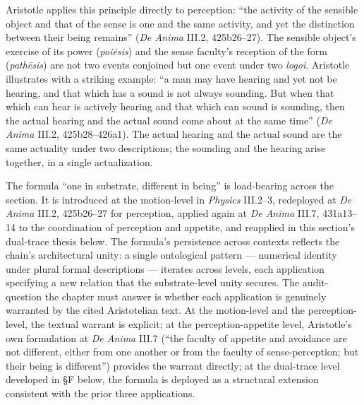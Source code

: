 Aristotle applies this principle directly to perception: ``the activity of the sensible object and that of the sense is one and the same activity, and yet the distinction between their being remains'' (\textit{De Anima} III.2, 425b26--27). The sensible object's exercise of its power (\textit{poiēsis}) and the sense faculty's reception of the form (\textit{pathēsis}) are not two events conjoined but one event under two \textit{logoi}. Aristotle illustrates with a striking example: ``a man may have hearing and yet not be hearing, and that which has a sound is not always sounding. But when that which can hear is actively hearing and that which can sound is sounding, then the actual hearing and the actual sound come about at the same time'' (\textit{De Anima} III.2, 425b28--426a1). The actual hearing and the actual sound are the same actuality under two descriptions; the sounding and the hearing arise together, in a single actualization.

The formula ``one in substrate, different in being'' is load-bearing across the section. It is introduced at the motion-level in \textit{Physics} III.2--3, redeployed at \textit{De Anima} III.2, 425b26--27 for perception, applied again at \textit{De Anima} III.7, 431a13--14 to the coordination of perception and appetite, and reapplied in this section's dual-trace thesis below. The formula's persistence across contexts reflects the chain's architectural unity: a single ontological pattern --- numerical identity under plural formal descriptions --- iterates across levels, each application specifying a new relation that the substrate-level unity secures. The audit-question the chapter must answer is whether each application is genuinely warranted by the cited Aristotelian text. At the motion-level and the perception-level, the textual warrant is explicit; at the perception-appetite level, Aristotle's own formulation at \textit{De Anima} III.7 (``the faculty of appetite and avoidance are not different, either from one another or from the faculty of sense-perception; but their being is different'') provides the warrant directly; at the dual-trace level developed in §F below, the formula is deployed as a structural extension consistent with the prior three applications.

